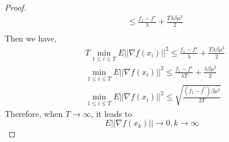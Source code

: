 \documentclass[12pt]{report}
\begin{document}
\begin{proof}
\begin{equation*}
\begin{split}
	& \leq \frac{f_1 - f^{\star}}{\lambda} + \frac{T\lambda\beta\mu^2}{2} \\
	\end{split}
	\end{equation*}
	Then we have,
	\begin{equation*}
	\begin{split}
	& T\min_{1 \leq i \leq T}E||\nabla f(x_i)||^2 \leq \frac{f_1 - f^{\star}}{\lambda} + \frac{T\lambda\beta\mu^2}{2} \\
	& \min_{1 \leq i \leq T} E||\nabla f(x_i)||^2 \leq \frac{f_1 - f^{\star}}{\lambda T} + \frac{\lambda\beta\mu^2}{2} \\
	& \min_{1 \leq i \leq T} E||\nabla f(x_i)||^2 \leq \sqrt{\frac{(f_1 - f^*)\beta\mu^2}{2T}}
	\end{split}
	\end{equation*}
	Therefore, when $T \rightarrow \infty$, it leads to
	\begin{equation*}
	E||\nabla f(x_k)|| \rightarrow 0, k \rightarrow \infty
	\end{equation*}
\end{proof}
\end{document}
